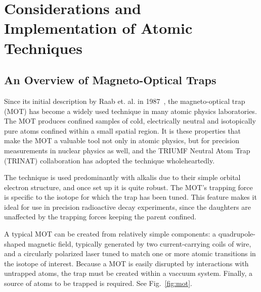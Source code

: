 %
%
%
\clearpage
\chapter{Considerations and Implementation of Atomic Techniques}
\label{atomicphysics_chapter}
\section{An Overview of Magneto-Optical Traps}
\label{section:mot}
Since its initial description by Raab et. al. in 1987~\cite{raabprentiss}, the magneto-optical trap (MOT) has become a widely used technique in many atomic physics laboratories.  The MOT produces confined samples of cold, electrically neutral and isotopically pure atoms confined within a small spatial region.  It is these properties that make the MOT a valuable tool not only in atomic physics, but for precision measurements in nuclear physics as well, and the TRIUMF Neutral Atom Trap (TRINAT) collaboration has adopted the technique wholeheartedly.

The technique is used predominantly with alkalis due to their simple orbital electron structure, and once set up it is quite robust.  The MOT's trapping force is specific to the isotope for which the trap has been tuned. This feature makes it ideal for use in precision radioactive decay experiments, since the daughters are unaffected by the trapping forces keeping the parent confined.

A typical MOT can be created from relatively simple components:  a quadrupole-shaped magnetic field, typically generated by two current-carrying coils of wire, and a circularly polarized laser tuned to match one or more atomic transitions in the isotope of interest.  Because a MOT is easily disrupted by interactions with untrapped atoms, the trap must be created within a vaccuum system.  Finally, a source of atoms to be trapped is required.  See Fig.~\ref{fig:mot}.

